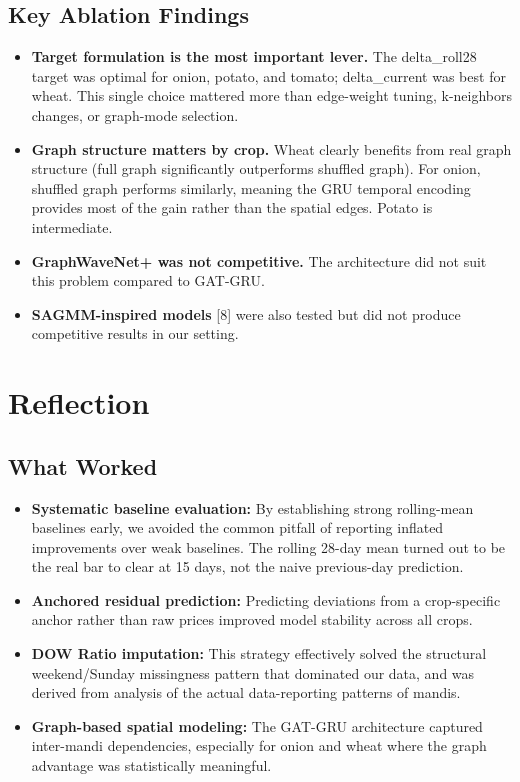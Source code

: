 \documentclass[conference]{IEEEtran}
\begin{document}
\subsection{Key Ablation Findings}

\begin{itemize}
\item \textbf{Target formulation is the most important lever.} The delta\_roll28 target was optimal for onion, potato, and tomato; delta\_current was best for wheat. This single choice mattered more than edge-weight tuning, k-neighbors changes, or graph-mode selection.
\item \textbf{Graph structure matters by crop.} Wheat clearly benefits from real graph structure (full graph significantly outperforms shuffled graph). For onion, shuffled graph performs similarly, meaning the GRU temporal encoding provides most of the gain rather than the spatial edges. Potato is intermediate.
\item \textbf{GraphWaveNet+ was not competitive.} The architecture did not suit this problem compared to GAT-GRU.
\item \textbf{SAGMM-inspired models} [8] were also tested but did not produce competitive results in our setting.
\end{itemize}

\section{Reflection}

\subsection{What Worked}

\begin{itemize}
\item \textbf{Systematic baseline evaluation:} By establishing strong rolling-mean baselines early, we avoided the common pitfall of reporting inflated improvements over weak baselines. The rolling 28-day mean turned out to be the real bar to clear at 15 days, not the naive previous-day prediction.
\item \textbf{Anchored residual prediction:} Predicting deviations from a crop-specific anchor rather than raw prices improved model stability across all crops.
\item \textbf{DOW Ratio imputation:} This strategy effectively solved the structural weekend/Sunday missingness pattern that dominated our data, and was derived from analysis of the actual data-reporting patterns of mandis.
\item \textbf{Graph-based spatial modeling:} The GAT-GRU architecture captured inter-mandi dependencies, especially for onion and wheat where the graph advantage was statistically meaningful.
\end{itemize}
\end{document}
